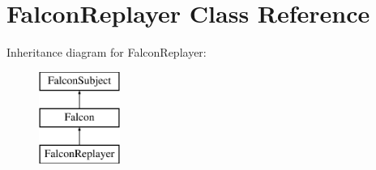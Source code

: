 \hypertarget{classFalconReplayer}{
\section{FalconReplayer Class Reference}
\label{classFalconReplayer}
}
Inheritance diagram for FalconReplayer:\begin{figure}[H]
\begin{center}
\leavevmode
\includegraphics[height=3.000000cm]{classFalconReplayer}
\end{center}
\end{figure}

